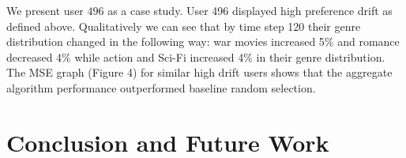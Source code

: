 \documentclass{article}
\begin{document}
We present user $496$ as a case study. User 496 displayed high preference drift as defined above. Qualitatively we can see that by time step 120 their genre distribution changed in the following way: war movies increased 5\% and romance decreased 4\% while action and Sci-Fi increased 4\% in their genre distribution. The MSE graph (Figure 4) for similar high drift users shows that the aggregate algorithm performance outperformed baseline random selection.  

\section{Conclusion and Future Work}

\nocite{kawale2015efficient}
\nocite{wang2017online}
\nocite{zhao2013interactive}
\nocite{cherkassky2013sequential}
\nocite{arulampalam2002tutorial}
\nocite{douc2005comparison}
\nocite{doucet2009tutorial}
\nocite{orhan2012particle}
\nocite{lo2017temporal}
\nocite{lindsten2015rao}



\end{document}
